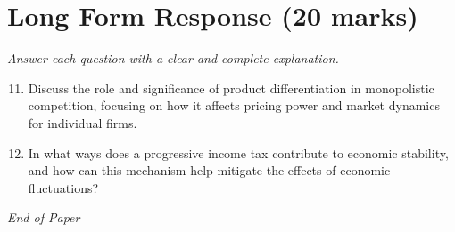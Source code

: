 \documentclass[12pt]{article}
\begin{document}
\section*{Long Form Response (20 marks)}
\textit{Answer each question with a clear and complete explanation.}
\begin{enumerate}[label=\arabic*.]
\setcounter{enumi}{10}
\item Discuss the role and significance of product differentiation in monopolistic competition, focusing on how it affects pricing power and market dynamics for individual firms.
\item In what ways does a progressive income tax contribute to economic stability, and how can this mechanism help mitigate the effects of economic fluctuations?
\end{enumerate}

\vfill
\noindent\textit{End of Paper}
\end{document}
